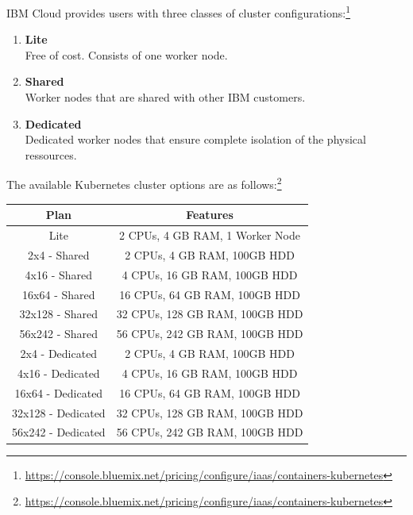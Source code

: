 IBM Cloud provides users with three classes of cluster configurations:\footnote{\url{https://console.bluemix.net/pricing/configure/iaas/containers-kubernetes}}

\begin{minipage}{\textwidth}
    \begin{enumerate}[nolistsep]
        \item \textbf{Lite}\\
            Free of cost. Consists of one worker node.
        \item \textbf{Shared}\\
            Worker nodes that are shared with other IBM customers.
        \item \textbf{Dedicated}\\
            Dedicated worker nodes that ensure complete isolation of the physical ressources.
    \end{enumerate}
\end{minipage}

The available Kubernetes cluster options are as follows:\footnote{\url{https://console.bluemix.net/pricing/configure/iaas/containers-kubernetes}}

\begin{minipage}{\textwidth}
        \begin{tabular}{ | c | c | } 
            \hline
             \textbf{Plan} & 
             \textbf{Features}\\
             \hline \hline
             Lite & 
             2 CPUs, 4 GB RAM, 1 Worker Node\\
             \hline 
             2x4 - Shared & 
             2 CPUs, 4 GB RAM, 100GB HDD\\
             \hline 
             4x16 - Shared & 
             4 CPUs, 16 GB RAM, 100GB HDD\\
             \hline 
             16x64 - Shared & 
             16 CPUs, 64 GB RAM, 100GB HDD\\
             \hline  
             32x128 - Shared & 
             32 CPUs, 128 GB RAM, 100GB HDD\\
             \hline  
             56x242 - Shared & 
             56 CPUs, 242 GB RAM, 100GB HDD\\
             \hline 
             2x4 - Dedicated & 
             2 CPUs, 4 GB RAM, 100GB HDD\\
             \hline 
             4x16 - Dedicated & 
             4 CPUs, 16 GB RAM, 100GB HDD\\
             \hline 
             16x64 - Dedicated & 
             16 CPUs, 64 GB RAM, 100GB HDD\\
             \hline  
             32x128 - Dedicated & 
             32 CPUs, 128 GB RAM, 100GB HDD\\
             \hline  
             56x242 - Dedicated & 
             56 CPUs, 242 GB RAM, 100GB HDD\\
             \hline 
        \end{tabular}
        \centering
\end{minipage}


